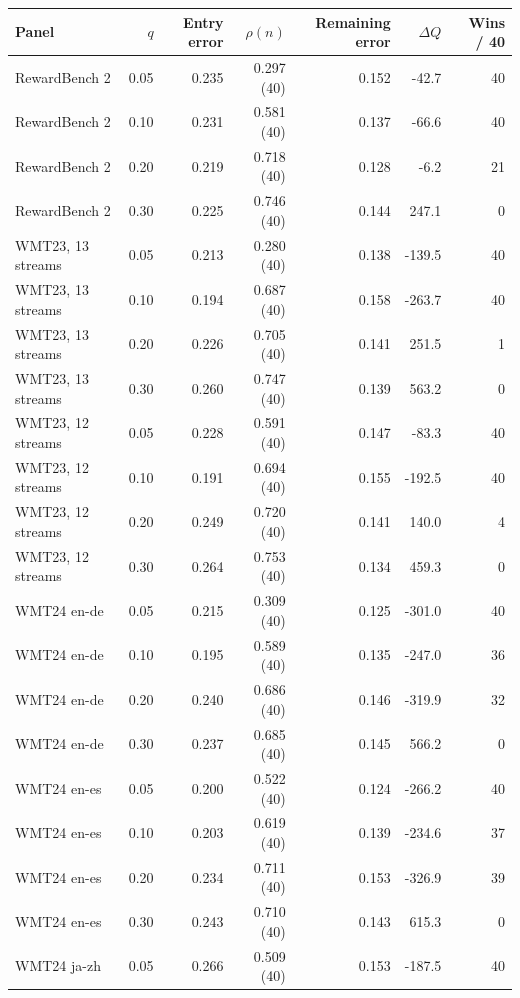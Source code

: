 \begin{table}[t]
\centering\small


\begin{tabular}{lrrrrrr}
\toprule
Panel & $q$ & Entry error & $\rho(n)$ & Remaining error & $\Delta Q$ & Wins / 40 \\
\midrule
RewardBench 2 & 0.05 & 0.235 & 0.297 (40) & 0.152 & -42.7 & 40 \\
RewardBench 2 & 0.10 & 0.231 & 0.581 (40) & 0.137 & -66.6 & 40 \\
RewardBench 2 & 0.20 & 0.219 & 0.718 (40) & 0.128 & -6.2 & 21 \\
RewardBench 2 & 0.30 & 0.225 & 0.746 (40) & 0.144 & 247.1 & 0 \\
\addlinespace
WMT23, 13 streams & 0.05 & 0.213 & 0.280 (40) & 0.138 & -139.5 & 40 \\
WMT23, 13 streams & 0.10 & 0.194 & 0.687 (40) & 0.158 & -263.7 & 40 \\
WMT23, 13 streams & 0.20 & 0.226 & 0.705 (40) & 0.141 & 251.5 & 1 \\
WMT23, 13 streams & 0.30 & 0.260 & 0.747 (40) & 0.139 & 563.2 & 0 \\
\addlinespace
WMT23, 12 streams & 0.05 & 0.228 & 0.591 (40) & 0.147 & -83.3 & 40 \\
WMT23, 12 streams & 0.10 & 0.191 & 0.694 (40) & 0.155 & -192.5 & 40 \\
WMT23, 12 streams & 0.20 & 0.249 & 0.720 (40) & 0.141 & 140.0 & 4 \\
WMT23, 12 streams & 0.30 & 0.264 & 0.753 (40) & 0.134 & 459.3 & 0 \\
\addlinespace
WMT24 en-de & 0.05 & 0.215 & 0.309 (40) & 0.125 & -301.0 & 40 \\
WMT24 en-de & 0.10 & 0.195 & 0.589 (40) & 0.135 & -247.0 & 36 \\
WMT24 en-de & 0.20 & 0.240 & 0.686 (40) & 0.146 & -319.9 & 32 \\
WMT24 en-de & 0.30 & 0.237 & 0.685 (40) & 0.145 & 566.2 & 0 \\
\addlinespace
WMT24 en-es & 0.05 & 0.200 & 0.522 (40) & 0.124 & -266.2 & 40 \\
WMT24 en-es & 0.10 & 0.203 & 0.619 (40) & 0.139 & -234.6 & 37 \\
WMT24 en-es & 0.20 & 0.234 & 0.711 (40) & 0.153 & -326.9 & 39 \\
WMT24 en-es & 0.30 & 0.243 & 0.710 (40) & 0.143 & 615.3 & 0 \\
\addlinespace
WMT24 ja-zh & 0.05 & 0.266 & 0.509 (40) & 0.153 & -187.5 & 40 \\

\end{tabular}
\end{table}
